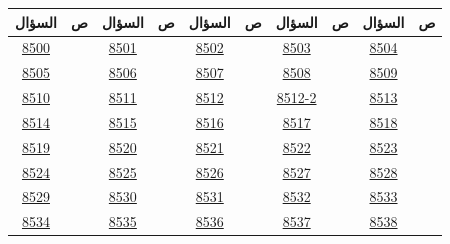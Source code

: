 \documentclass[11pt,a4paper]{article}
\newcommand{\en}[1]{\textenglish{#1}}
\begin{document}
{\small
\begin{longtable}{|c|c||c|c||c|c||c|c||c|c|}
\hline
\textbf{السؤال} & \textbf{ص} & \textbf{السؤال} & \textbf{ص} & \textbf{السؤال} & \textbf{ص} & \textbf{السؤال} & \textbf{ص} & \textbf{السؤال} & \textbf{ص}\\\hline\endhead
\hyperref[q8500]{\en{8500}} & \pageref{q8500} & \hyperref[q8501]{\en{8501}} & \pageref{q8501} & \hyperref[q8502]{\en{8502}} & \pageref{q8502} & \hyperref[q8503]{\en{8503}} & \pageref{q8503} & \hyperref[q8504]{\en{8504}} & \pageref{q8504}\\\hline
\hyperref[q8505]{\en{8505}} & \pageref{q8505} & \hyperref[q8506]{\en{8506}} & \pageref{q8506} & \hyperref[q8507]{\en{8507}} & \pageref{q8507} & \hyperref[q8508]{\en{8508}} & \pageref{q8508} & \hyperref[q8509]{\en{8509}} & \pageref{q8509}\\\hline
\hyperref[q8510]{\en{8510}} & \pageref{q8510} & \hyperref[q8511]{\en{8511}} & \pageref{q8511} & \hyperref[q8512]{\en{8512}} & \pageref{q8512} & \hyperref[q8512-2]{\en{8512-2}} & \pageref{q8512-2} & \hyperref[q8513]{\en{8513}} & \pageref{q8513}\\\hline
\hyperref[q8514]{\en{8514}} & \pageref{q8514} & \hyperref[q8515]{\en{8515}} & \pageref{q8515} & \hyperref[q8516]{\en{8516}} & \pageref{q8516} & \hyperref[q8517]{\en{8517}} & \pageref{q8517} & \hyperref[q8518]{\en{8518}} & \pageref{q8518}\\\hline
\hyperref[q8519]{\en{8519}} & \pageref{q8519} & \hyperref[q8520]{\en{8520}} & \pageref{q8520} & \hyperref[q8521]{\en{8521}} & \pageref{q8521} & \hyperref[q8522]{\en{8522}} & \pageref{q8522} & \hyperref[q8523]{\en{8523}} & \pageref{q8523}\\\hline
\hyperref[q8524]{\en{8524}} & \pageref{q8524} & \hyperref[q8525]{\en{8525}} & \pageref{q8525} & \hyperref[q8526]{\en{8526}} & \pageref{q8526} & \hyperref[q8527]{\en{8527}} & \pageref{q8527} & \hyperref[q8528]{\en{8528}} & \pageref{q8528}\\\hline
\hyperref[q8529]{\en{8529}} & \pageref{q8529} & \hyperref[q8530]{\en{8530}} & \pageref{q8530} & \hyperref[q8531]{\en{8531}} & \pageref{q8531} & \hyperref[q8532]{\en{8532}} & \pageref{q8532} & \hyperref[q8533]{\en{8533}} & \pageref{q8533}\\\hline
\hyperref[q8534]{\en{8534}} & \pageref{q8534} & \hyperref[q8535]{\en{8535}} & \pageref{q8535} & \hyperref[q8536]{\en{8536}} & \pageref{q8536} & \hyperref[q8537]{\en{8537}} & \pageref{q8537} & \hyperref[q8538]{\en{8538}} & \pageref{q8538}\\\hline

\end{longtable}}
\end{document}
